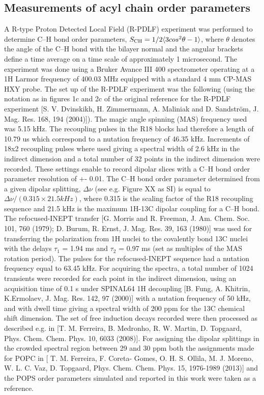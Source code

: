 \documentclass[journal=jpcbfk,manuscript=article]{achemso}
\begin{document}
\subsection{Measurements of acyl chain order parameters}
A R-type Proton Detected Local Field (R-PDLF) experiment was performed to determine C--H bond order
parameters, $S_{\rm{CH}}=1/2\langle3cos^2\theta-1\rangle$, where $\theta$ denotes the angle of the C--H bond
with the bilayer normal and the angular brackets define a time average on a time scale of approximately 1 microsecond.
The experiment was done using a Bruker Avance III 400 spectrometer operating at a 1H Larmor frequency of 400.03 MHz
equipped with a standard 4 mm CP-MAS HXY probe. The set up of the R-PDLF experiment was the following
(using the notation as in figures 1c and 2c of the original reference for the R-PDLF
experiment [S. V. Dvinskikh, H. Zimmermann, A. Maliniak and D. Sandström, J. Mag. Res. 168, 194 (2004)]).
The magic angle spinning (MAS) frequency used was 5.15 kHz. The recoupling pulses in the R18 blocks had
therefore a length of 10.79 us which correspond to a nutation frequency of 46.35 kHz. Increments of 18x2 recoupling
pulses where used giving a spectral width of 2.6 kHz in the indirect dimension and a total number of 32 points in
the indirect dimension were recorded. These settings enable to record dipolar slices with a C--H bond order parameter
resolution of +- 0.01. The C--H bond order parameter determined from a given dipolar
splitting, $\Delta\nu$ (see e.g. Figure XX as SI) is equal to $\Delta\nu/(0.315\times21.5 kHz)$, where 0.315 is
the scaling factor of the R18 recoupling sequence and 21.5 kHz is the maximum 1H-13C dipolar coupling for a C--H bond.
The refocused-INEPT transfer [G. Morris and R. Freeman, J. Am. Chem. Soc. 101, 760 (1979); D. Burum, R. Ernst, J. Mag. Res. 39, 163 (1980)]
was used for transferring the polarization from 1H nuclei to the covalently bond 13C nuclei with the delays $\tau_1$ = 1.94 ms and $\tau_2$ = 0.97 ms
(set as multiples of the MAS rotation period). The pulses for the refocused-INEPT sequence had a nutation frequency equal to 63.45 kHz.
For acquiring the spectra, a total number of 1024 transients were recorded for each point in the indirect dimension, using an acquisition time of 0.1 s under SPINAL64 1H decoupling [B. Fung, A. Khitrin, K.Ermolaev, J. Mag. Res. 142, 97 (2000)] with a nutation frequency of 50 kHz, and with dwell time giving a spectral width of 200 ppm for the 13C chemical shift dimension. The set of free induction decays recorded were then processed as described e.g. in [T. M. Ferreira, B. Medronho, R. W. Martin, D. Topgaard, Phys. Chem. Chem. Phys. 10, 6033 (2008)]. For assigning the dipolar splittings in the crowded spectral region between 29 and 30 ppm both the assignments made for POPC in [ T. M. Ferreira, F. Coreta- Gomes, O. H. S. Ollila, M. J. Moreno, W. L. C. Vaz, D. Topgaard, Phys. Chem. Chem. Phys. 15, 1976-1989 (2013)] and the POPS order parameters simulated and reported in this work were taken as a reference. 
 
\end{document}
